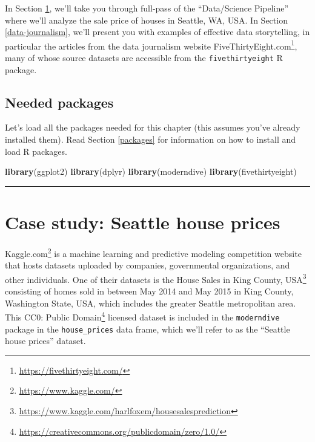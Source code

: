\documentclass[12pt, krantz2,]{krantz}
\makeatletter
\newenvironment{Shaded}{\begin{snugshade}}{\end{snugshade}}
\newcommand{\KeywordTok}[1]{\textcolor[rgb]{0.27,0.27,0.27}{\textbf{#1}}}
\newcommand{\NormalTok}[1]{#1}
\renewcommand{\href}[2]{#2\footnote{\url{#1}}}
\newenvironment{kframe}{%
\medskip{}
\setlength{\fboxsep}{.8em}
 \def\at@end@of@kframe{}%
 \ifinner\ifhmode%
  \def\at@end@of@kframe{\end{minipage}}%
  \begin{minipage}{\columnwidth}%
 \fi\fi%
 \def\FrameCommand##1{\hskip\@totalleftmargin \hskip-\fboxsep
 \colorbox{shadecolor}{##1}\hskip-\fboxsep
     \hskip-\linewidth \hskip-\@totalleftmargin \hskip\columnwidth}%
 \MakeFramed {\advance\hsize-\width
   \@totalleftmargin\z@ \linewidth\hsize
   \@setminipage}}%
 {\par\unskip\endMakeFramed%
 \at@end@of@kframe}
\renewenvironment{Shaded}{\begin{kframe}}{\end{kframe}}
\makeatother
\begin{document}
In Section \ref{seattle-house-prices}, we'll take you through full-pass of the ``Data/Science Pipeline'' where we'll analyze the sale price of houses in Seattle, WA, USA. In Section \ref{data-journalism}, we'll present you with examples of effective data storytelling, in particular the articles from the data journalism website \href{https://fivethirtyeight.com/}{FiveThirtyEight.com}, many of whose source datasets are accessible from the \texttt{fivethirtyeight} R package.

\hypertarget{needed-packages-10}{%
\subsection*{Needed packages}\label{needed-packages-10}}


Let's load all the packages needed for this chapter (this assumes you've already installed them). Read Section \ref{packages} for information on how to install and load R packages.

\begin{Shaded}
\begin{Highlighting}[]
\KeywordTok{library}\NormalTok{(ggplot2)}
\KeywordTok{library}\NormalTok{(dplyr)}
\KeywordTok{library}\NormalTok{(moderndive)}
\KeywordTok{library}\NormalTok{(fivethirtyeight)}
\end{Highlighting}
\end{Shaded}

\begin{center}\rule{0.5\linewidth}{\linethickness}\end{center}

\hypertarget{seattle-house-prices}{%
\section{Case study: Seattle house prices}\label{seattle-house-prices}}

\href{https://www.kaggle.com/}{Kaggle.com} is a machine learning and predictive modeling competition website that hosts datasets uploaded by companies, governmental organizations, and other individuals. One of their datasets is the \href{https://www.kaggle.com/harlfoxem/housesalesprediction}{House Sales in King County, USA} consisting of homes sold in between May 2014 and May 2015 in King County, Washington State, USA, which includes the greater Seattle metropolitan area. This \href{https://creativecommons.org/publicdomain/zero/1.0/}{CC0: Public Domain} licensed dataset is included in the \texttt{moderndive} package in the \texttt{house\_prices} data frame, which we'll refer to as the ``Seattle house prices'' dataset.
\end{document}
